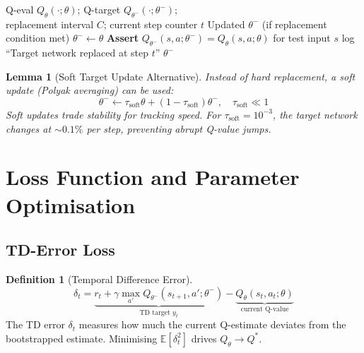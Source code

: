 \documentclass[12pt,a4paper]{article}
\theoremstyle{definition}
\newtheorem{definition}{Definition}[section]
\theoremstyle{plain}
\newtheorem{lemma}[theorem]{Lemma}
\theoremstyle{remark}
\newcommand{\Qeval}{Q_\theta}
\newcommand{\Qtgt}{Q_{\theta^-}}
\newcommand{\EE}{\mathbb{E}}
\begin{document}
\begin{algorithm}[H]
\caption{Target Network Management: Replace $\theta^-$}
\label{alg:target_replace}
\begin{algorithmic}[1]
\Require Q-eval $\Qeval(\cdot;\theta)$; Q-target $\Qtgt(\cdot;\theta^-)$;\\
         replacement interval $C$; current step counter $t$
\Ensure Updated $\theta^-$ (if replacement condition met)
  \State $\theta^- \gets \theta$ 
  \State \textbf{Assert} $\Qtgt(s, a;\theta^-) = \Qeval(s, a;\theta)$ for test input $s$ 
  \State log ``Target network replaced at step $t$''
\EndIf
\State \Return $\theta^-$
\end{algorithmic}
\end{algorithm}

\begin{lemma}[Soft Target Update Alternative]
Instead of hard replacement, a \emph{soft update} (Polyak averaging) can be used:
\[
  \theta^- \gets \tau_{\text{soft}} \theta + (1 - \tau_{\text{soft}}) \theta^-, \quad \tau_{\text{soft}} \ll 1
\]
Soft updates trade stability for tracking speed. For $\tau_{\text{soft}} = 10^{-3}$, the target network changes at $\sim 0.1\%$ per step, preventing abrupt Q-value jumps.
\end{lemma}

\newpage
\section{Loss Function and Parameter Optimisation}
\label{sec:loss}

\subsection{TD-Error Loss}

\begin{definition}[Temporal Difference Error]
\[
  \delta_t = \underbrace{r_t + \gamma \max_{a'} \Qtgt(s_{t+1}, a';\theta^-)}_{\text{TD target } y_t} - \underbrace{\Qeval(s_t, a_t;\theta)}_{\text{current Q-value}}
\]
The TD error $\delta_t$ measures how much the current Q-estimate deviates from the bootstrapped estimate. Minimising $\EE[\delta_t^2]$ drives $\Qeval \to Q^*$.
\end{definition}
\end{document}
